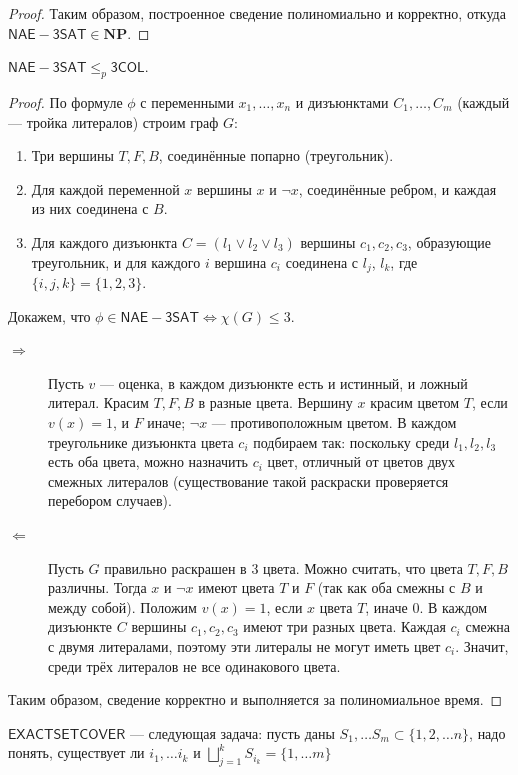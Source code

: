 \begin{proof}
    Таким образом, построенное сведение полиномиально и корректно, откуда $\mathsf{NAE-3SAT} \in \mathbf{NP}$.
\end{proof}

\begin{proposition}
    $\mathsf{NAE-3SAT} \le_p \mathsf{3COL}$.
\end{proposition}
\begin{proof}
    По формуле $\phi$ с переменными $x_1,\dots,x_n$ и дизъюнктами $C_1,\dots,C_m$ (каждый — тройка литералов) строим граф $G$:
    \begin{enumerate}
        \item Три вершины $T,F,B$, соединённые попарно (треугольник).
        \item Для каждой переменной $x$ вершины $x$ и $\neg x$, соединённые ребром, и каждая из них соединена с $B$.
        \item Для каждого дизъюнкта $C=(l_1\lor l_2\lor l_3)$ вершины $c_1,c_2,c_3$, образующие треугольник, и для каждого $i$ вершина $c_i$ соединена с $l_j$, $l_k$, где $\{i,j,k\}=\{1,2,3\}$.
    \end{enumerate}
    Докажем, что $\phi\in\mathsf{NAE-3SAT}\iff \chi(G) \le 3$.
    \begin{description}
        \item[$\Rightarrow$] Пусть $v$ — оценка, в каждом дизъюнкте есть и истинный, и ложный литерал. Красим $T,F,B$ в разные цвета. Вершину $x$ красим цветом $T$, если $v(x)=1$, и $F$ иначе; $\neg x$ — противоположным цветом. В каждом треугольнике дизъюнкта цвета $c_i$ подбираем так: поскольку среди $l_1,l_2,l_3$ есть оба цвета, можно назначить $c_i$ цвет, отличный от цветов двух смежных литералов (существование такой раскраски проверяется перебором случаев).
        \item[$\Leftarrow$] Пусть $G$ правильно раскрашен в 3 цвета. Можно считать, что цвета $T,F,B$ различны. Тогда $x$ и $\neg x$ имеют цвета $T$ и $F$ (так как оба смежны с $B$ и между собой). Положим $v(x)=1$, если $x$ цвета $T$, иначе $0$. В каждом дизъюнкте $C$ вершины $c_1,c_2,c_3$ имеют три разных цвета. Каждая $c_i$ смежна с двумя литералами, поэтому эти литералы не могут иметь цвет $c_i$. Значит, среди трёх литералов не все одинакового цвета.
    \end{description}
    Таким образом, сведение корректно и выполняется за полиномиальное время.
\end{proof}

\begin{definition}
    \(\mathsf{EXACTSETCOVER}\) --- следующая задача: пусть даны \(S_1, \dots S_m \subset \{1, 2, \dots n\}\), надо понять, существует ли \(i_1, \dots i_k\) и \(\bigsqcup_{j = 1}^k S_{i_k} = \{1, \dots m\}\)
\end{definition}

